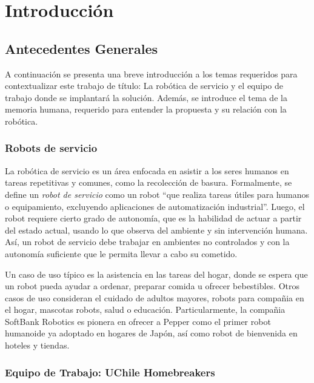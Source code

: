 
\chapter{Introducci\'on}


\section{Antecedentes Generales}

A continuaci\'on se presenta una breve introducci\'on a los temas requeridos para contextualizar este trabajo de t\'itulo: La rob\'otica de servicio y el equipo de trabajo donde se implantar\'a la soluci\'on. Adem\'as, se introduce el tema de la memoria humana, requerido para entender la propuesta y su relaci\'on con la rob\'otica.


\subsection{Robots de servicio}

La rob\'otica de servicio es un \'area enfocada en asistir a los seres humanos en tareas repetitivas y comunes, como la recolecci\'on de basura. Formalmente, se define un \textit{robot de servicio} como un robot ``que realiza tareas \'utiles para humanos o equipamiento, excluyendo aplicaciones de automatizaci\'on industrial''\cite{IFR}. Luego, el robot requiere cierto grado de autonom\'ia, que es la habilidad de actuar a partir del estado actual, usando lo que observa del ambiente y sin intervenci\'on humana. As\'i, un robot de servicio debe trabajar en ambientes no controlados y con la autonom\'ia suficiente que le permita llevar a cabo su cometido.

Un caso de uso t\'ipico es la asistencia en las tareas del hogar, donde se espera que un robot pueda ayudar a ordenar, preparar comida u ofrecer bebestibles. Otros casos de uso consideran el cuidado de adultos mayores, robots para compa\~nia en el hogar, mascotas robots, salud o educaci\'on. Particularmente, la compa\~nia SoftBank Robotics es pionera en ofrecer a Pepper como el primer robot humanoide ya adoptado en hogares de Jap\'on, as\'i como robot de bienvenida en hoteles y tiendas\cite{softbank}.


\subsection{Equipo de Trabajo: UChile Homebreakers}

